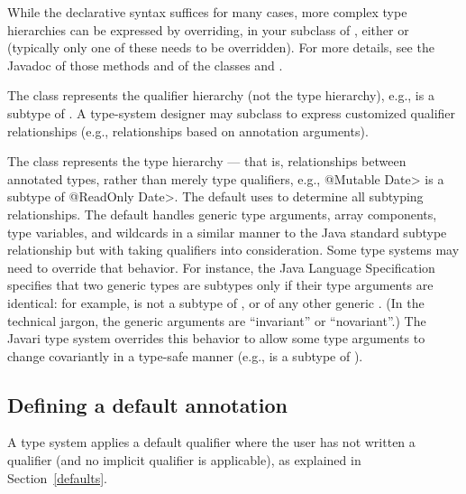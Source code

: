 While the declarative syntax suffices for many cases, more complex
type hierarchies can be expressed by overriding, in your subclass of ,
either  or  (typically
only one of these needs to be overridden).
For more details, see the Javadoc of those methods and of the classes
 and .

The  class represents the qualifier hierarchy (not the
type hierarchy), e.g., 
is a subtype of .  A type-system designer may subclass
 to express customized qualifier
relationships (e.g., relationships based on annotation
arguments).

The  class represents the type hierarchy ---
that is, relationships between
annotated types, rather than merely type qualifiers, e.g., \<@Mutable
Date> is a subtype of \<@ReadOnly Date>.  The default  uses
 to determine all subtyping relationships.
The default  handles
generic type arguments, array components, type variables, and
wildcards in a similar manner to the Java standard subtype
relationship but with taking qualifiers into consideration.  Some type
systems may need to override that behavior.  For instance, the Java
Language Specification specifies that two generic types are subtypes only
if their type arguments are identical:  for example,
 is not a subtype of , or of any other
generic .
(In the technical jargon, the generic arguments are ``invariant'' or ``novariant''.)
The Javari type system overrides this
behavior to allow some type arguments to change covariantly in a type-safe
manner (e.g.,
 is a subtype of ).


\subsection{Defining a default annotation\label{typesystem-defaults}}

A type system applies a default qualifier where the user has not written a
qualifier (and no implicit qualifier is applicable), as explained in
Section~\ref{defaults}.

